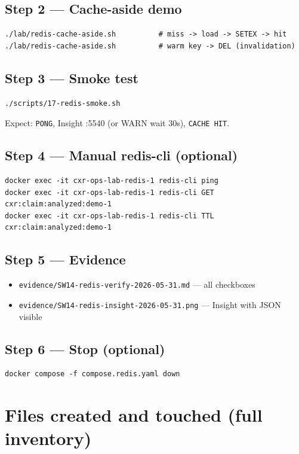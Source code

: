 \documentclass[11pt,a4paper]{report}
\begin{document}
\section{Step 2 --- Cache-aside demo}
\begin{lstlisting}[style=bash]
./lab/redis-cache-aside.sh          # miss -> load -> SETEX -> hit
./lab/redis-cache-aside.sh          # warm key -> DEL (invalidation)
\end{lstlisting}

\section{Step 3 --- Smoke test}
\begin{lstlisting}[style=bash]
./scripts/17-redis-smoke.sh
\end{lstlisting}
Expect: \texttt{PONG}, Insight :5540 (or WARN wait 30s), \texttt{CACHE HIT}.

\section{Step 4 --- Manual redis-cli (optional)}
\begin{lstlisting}[style=bash]
docker exec -it cxr-ops-lab-redis-1 redis-cli ping
docker exec -it cxr-ops-lab-redis-1 redis-cli GET cxr:claim:analyzed:demo-1
docker exec -it cxr-ops-lab-redis-1 redis-cli TTL cxr:claim:analyzed:demo-1
\end{lstlisting}

\section{Step 5 --- Evidence}
\begin{itemize}
  \item \texttt{evidence/SW14-redis-verify-2026-05-31.md} --- all checkboxes
  \item \texttt{evidence/SW14-redis-insight-2026-05-31.png} --- Insight with JSON visible
\end{itemize}

\section{Step 6 --- Stop (optional)}
\begin{lstlisting}[style=bash]
docker compose -f compose.redis.yaml down
\end{lstlisting}

\chapter{Files created and touched (full inventory)}
\end{document}
